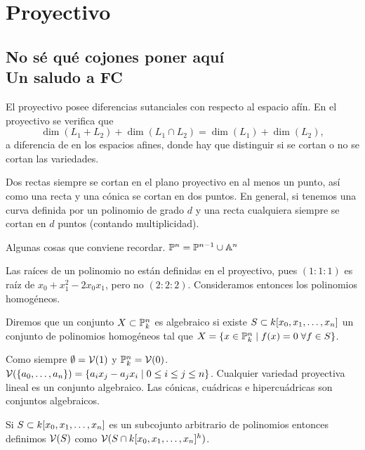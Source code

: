 \documentclass[ACGA.tex]{subfiles}
\begin{document}
\chapter{Proyectivo}

\section{No sé qué cojones poner aquí\\ Un saludo a FC}
El proyectivo posee diferencias sutanciales con respecto al espacio afín. En el proyectivo se verifica que
$$
\dim(L_1 + L_2) + \dim(L_1 \cap L_2) = \dim(L_1) + \dim(L_2),
$$
a diferencia de en los espacios afines, donde hay que distinguir si se cortan o no se cortan las variedades. 

Dos rectas siempre se cortan en el plano proyectivo en al menos un punto, así como una recta y una cónica se cortan en dos puntos. En general, si tenemos una curva definida por un polinomio de grado $d$ y una recta cualquiera siempre se cortan en $d$ puntos (contando multiplicidad).

Algunas cosas que conviene recordar. $\mathbb{P}^n = \mathbb{P}^{n-1}\cup \mathbb{A}^n$

Las raíces de un polinomio no están definidas en el proyectivo, pues $(1:1:1)$ es raíz de $x_0 + x_1^2 - 2x_0x_1$, pero no $(2:2:2)$. Consideramos entonces los polinomios homogéneos. 

\begin{defi}
Diremos que un conjunto $X\subset \mathbb{P}^n_k$ es algebraico si existe $S\subset k[x_0,x_1,\dotsc,x_{n}]$ un conjunto de polinomios homogéneos tal que $X=\{x\in\mathbb{P}^n_k \mid f(x)=0 \; \forall f\in S\}$.
\end{defi}
Como siempre $\emptyset = \mathcal{V}(1)$ y $\mathbb{P}^n_k = \mathcal{V}(0)$. $\mathcal{V}(\{a_0,\dotsc,a_n\}) = \{a_ix_j - a_j x_i \mid 0\leq i \leq j \leq n\}$. Cualquier variedad proyectiva lineal es un conjunto algebraico. Las cónicas, cuádricas e hipercuádricas son conjuntos algebraicos.

Si $S\subset k[x_0,x_1,\dotsc,x_{n}]$ es un subcojunto arbitrario de polinomios entonces definimos $\mathcal{V}(S)$ como $\mathcal{V}(S\cap k[x_0,x_1,\dotsc,x_{n}]^h)$. 
\end{document}

